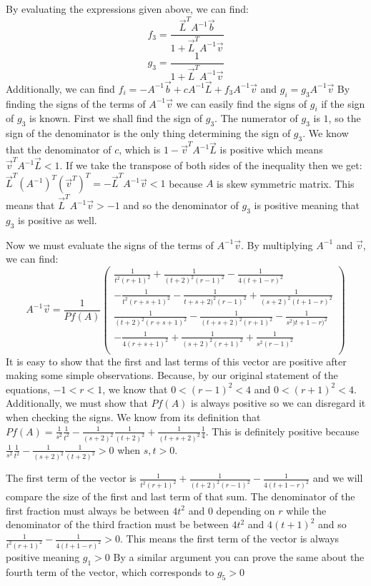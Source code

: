 \documentclass[11pt,leqno]{article}
\theoremstyle{definition}
\theoremstyle{remark}
\numberwithin{equation}{section}
\begin{document}
\label{willthm}
By evaluating the expressions given above, we can find: 
$$f_3=\frac{\vec{L}^T A^{-1}\vec{b}}{1+\vec{L}^T A^{-1}\vec{v}}$$
$$g_3=\frac{1}{1+\vec{L}^T A^{-1} \vec{v}}$$
Additionally, we can find $f_i=-A^{-1}\vec{b}+cA^{-1}\vec{L}+f_3A^{-1}\vec{v}$ and $g_i=g_3 A^{-1}\vec{v}$
By finding the signs of the terms of $A^{-1}\vec{v}$ we can easily find the signs of $g_i$ if the sign of $g_3$ is known. First we shall find the sign of $g_3$.
The numerator of $g_3$ is $1$, so the sign of the denominator is the only thing determining the sign of $g_3$.
We know that the denominator of $c$, which is $1-\vec{v}^T A^{-1}\vec{L}$ is positive which means $\vec{v}^T A^{-1}\vec{L}<1$.
If we take the transpose of both sides of the inequality then we get: $\vec{L}^T (A^{-1})^T (\vec{v}^T)^T=-\vec{L}^T A^{-1} \vec{v}<1$ because $A$ is skew symmetric matrix. This means that $\vec{L}^T A^{-1} \vec{v}>-1$ and so the denominator of $g_3$ is positive meaning that $g_3$ is positive as well.

Now we must evaluate the signs of the terms of $A^{-1}\vec{v}$. By multiplying $A^{-1}$ and $\vec{v}$, we can find:
$$A^{-1}\vec{v}=\frac{1}{Pf(A)} \left( {\begin{array}{c}
\frac{1}{t^2(r+1)^2}+\frac{1}{(t+2)^2(r-1)^2}-\frac{1}{4(t+1-r)^2} \\
-\frac{1}{t^2(r+s+1)^2}-\frac{1}{t+s+2)^2(r-1)^2}+\frac{1}{(s+2)^2(t+1-r)^2} \\
\frac{1}{(t+2)^2(r+s+1)^2}-\frac{1}{(t+s+2)^2(r+1)^2}-\frac{1}{s^2)t+1-r)^2} \\
-\frac{1}{4(r+s+1)^2}+\frac{1}{(s+2)^2(r+1)^2}+\frac{1}{s^2(r-1)^2} \\
\end{array} } \right)
$$
It is easy to show that the first and last terms of this vector are positive after making some simple observations. Because, by our original statement of the equations, $-1<r<1$, we know that $0<(r-1)^2<4$ and $0<(r+1)^2<4$. Additionally, we must show that $Pf(A)$ is always positive so we can disregard it when checking the signs. We know from its definition that $Pf(A)=\frac{1}{s^2}\frac{1}{t^2}-\frac{1}{(s+2)^2}\frac{1}{(t+2)^2}+\frac{1}{(t+s+2)^2}\frac{1}{4}$. This is definitely positive because $\frac{1}{s^2}\frac{1}{t^2}-\frac{1}{(s+2)^2}\frac{1}{(t+2)^2}>0$ when $s,t>0$.

The first term of the vector is $\frac{1}{t^2(r+1)^2}+\frac{1}{(t+2)^2(r-1)^2}-\frac{1}{4(t+1-r)^2}$ and we will compare the size of the first and last term of that sum. The denominator of the first fraction must always be between $4t^2$ and $0$ depending on $r$ while the denominator of the third fraction must be between $4t^2$ and $4(t+1)^2$ and so $\frac{1}{t^2(r+1)^2}-\frac{1}{4(t+1-r)^2}>0$.
This means the first term of the vector is always positive meaning $g_1>0$
By a similar argument you can prove the same about the fourth term of the vector, which corresponds to $g_5>0$
\end{document}
